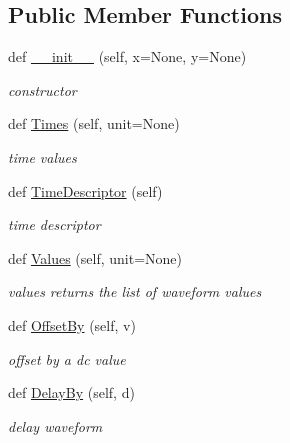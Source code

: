 \subsection*{Public Member Functions}
\begin{DoxyCompactItemize}
\item 
def \hyperlink{classSignalIntegrity_1_1TimeDomain_1_1Waveform_1_1Waveform_1_1Waveform_acde8672c68901fd28a5cb310b12689ae}{\+\_\+\+\_\+init\+\_\+\+\_\+} (self, x=None, y=None)
\begin{DoxyCompactList}\small\item\em constructor \end{DoxyCompactList}\item 
def \hyperlink{classSignalIntegrity_1_1TimeDomain_1_1Waveform_1_1Waveform_1_1Waveform_a5ba53f81d111ea013ebb7f55ed99d959}{Times} (self, unit=None)
\begin{DoxyCompactList}\small\item\em time values \end{DoxyCompactList}\item 
def \hyperlink{classSignalIntegrity_1_1TimeDomain_1_1Waveform_1_1Waveform_1_1Waveform_ab3bfca96556298bcd23762dfefbc7d6e}{Time\+Descriptor} (self)
\begin{DoxyCompactList}\small\item\em time descriptor \end{DoxyCompactList}\item 
def \hyperlink{classSignalIntegrity_1_1TimeDomain_1_1Waveform_1_1Waveform_1_1Waveform_a3dc7b1e5eba8fb649156094dfdf7a893}{Values} (self, unit=None)
\begin{DoxyCompactList}\small\item\em values returns the list of waveform values \end{DoxyCompactList}\item 
def \hyperlink{classSignalIntegrity_1_1TimeDomain_1_1Waveform_1_1Waveform_1_1Waveform_a2410e463585763a64dcd8dfe62528134}{Offset\+By} (self, v)
\begin{DoxyCompactList}\small\item\em offset by a dc value \end{DoxyCompactList}\item 
def \hyperlink{classSignalIntegrity_1_1TimeDomain_1_1Waveform_1_1Waveform_1_1Waveform_adc875e86caadbd6201fd6a3528526cad}{Delay\+By} (self, d)
\begin{DoxyCompactList}\small\item\em delay waveform \end{DoxyCompactList}\item 

\end{DoxyCompactItemize}
